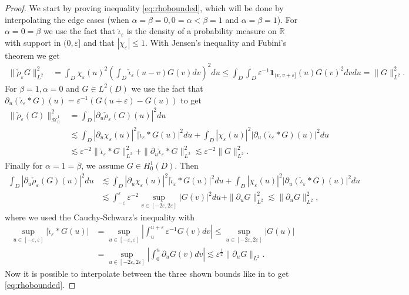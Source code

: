 \documentclass[a4paper, reqno, 12pt]{amsart}
\theoremstyle{plain}
\theoremstyle{definition}
\begin{document}
\begin{proof}
We start by proving inequality \eqref{eq:rhobounded}, which will be done by interpolating the edge cases (when $\alpha =\beta = 0, 0 = \alpha<\beta = 1$ and $\alpha = \beta =1$).
    For $\alpha = 0 = \beta$ we use the fact that $\check \iota_{\varepsilon}$ is the density of a probability measure on $\mathbb R$  with support in $(0,\varepsilon]$ and that $|\chi_{\varepsilon}|\leq 1$. With Jensen's inequality and Fubini's theorem we get 
    \begin{align*}
        \|\check\rho_{\varepsilon}G\|_{L^2}^2 &= \int_D \chi_{\varepsilon}(u)^2 \left( \int_D \check\iota_\varepsilon (u-v) G(v)dv\right)^2du \leq \int_D  \int_D \varepsilon^{-1}{\mathbf 1}_{(v,v+\varepsilon]}(u) G(v)^2dvdu = \| G\|_{L^2}^2.
    \end{align*}
For $\beta = 1,\alpha = 0$ and $G\in L^2(D)$ we use the fact that $\partial_u(\check\iota_{\varepsilon}\ast G)(u) = \varepsilon^{-1}(G(u+\varepsilon) - G(u))$ to get
    \begin{align*}
        \|\check \rho_{\varepsilon}(G)\|_{\dot{\mathcal H}^1_0}^2 &= \int_{D} |\partial_u\check\rho_{\varepsilon}(G)(u)|^2 du\\
        &  \lesssim \int_{D}|\partial_u \chi_{\varepsilon}(u)|^2 |\check\iota_{\varepsilon}\ast G(u)|^2 du + \int_{D} |\chi_{\varepsilon}(u)|^2 |\partial_u(\check\iota_{\varepsilon}\ast G)(u)|^2 du \\
        & \lesssim \varepsilon^{-2} \|\check\iota_{\varepsilon}\ast G\|_{L^2}^2 + \|\partial_u \check \iota_{\varepsilon}\ast G\|^2_{L^2} \lesssim \varepsilon^{-2} \|G\|_{L^2}^2.
    \end{align*}
    Finally for $\alpha = 1 = \beta$, we assume $G\in H^1_0(D)$. Then
    \begin{align*}
        \int_{D}|\partial_u\check\rho_{\varepsilon}(G)(u)|^2 du &\lesssim \int_{D}|\partial_u\chi_{\varepsilon}(u)|^2 |\check \iota_{\varepsilon}\ast G(u)|^2 du + \int_{D} |\chi_{\varepsilon}(u)|^2 |\partial_u(\check \iota_{\varepsilon}\ast G)(u)|^2 du \\
        &\lesssim \int_{-\varepsilon}^{\varepsilon} \varepsilon^{-2} \sup_{v\in[-2\varepsilon,2\varepsilon]} |G(v)|^2 du + \|\partial_u G\|^2_{L^2} \lesssim \|\partial_u G\|_{L^2}^2,
    \end{align*}
    where we used the Cauchy-Schwarz's inequality with 
    \begin{align} \label{eq:supiotaG}
       \sup_{u\in[-\varepsilon,\varepsilon]}|\check \iota_{\varepsilon}\ast G(u)| &= \sup_{u\in[-\varepsilon,\varepsilon]} \left|\int_u^{u+\varepsilon}\varepsilon^{-1} G(v)dv\right| \leq \sup_{u\in[-2\varepsilon,2\varepsilon]} |G(u)| \nonumber \\
       & = \sup_{u\in[-2\varepsilon,2\varepsilon]} \left|\int_0^{u}\partial_uG(v) dv \right|\lesssim  \varepsilon^{\frac12}\|\partial_u G\|_{L^2}.
    \end{align}
Now it is possible to interpolate between the three shown bounds like in \cite[Lemma A.4]{GPP24} to get \eqref{eq:rhobounded}.


\end{proof}
\end{document}
